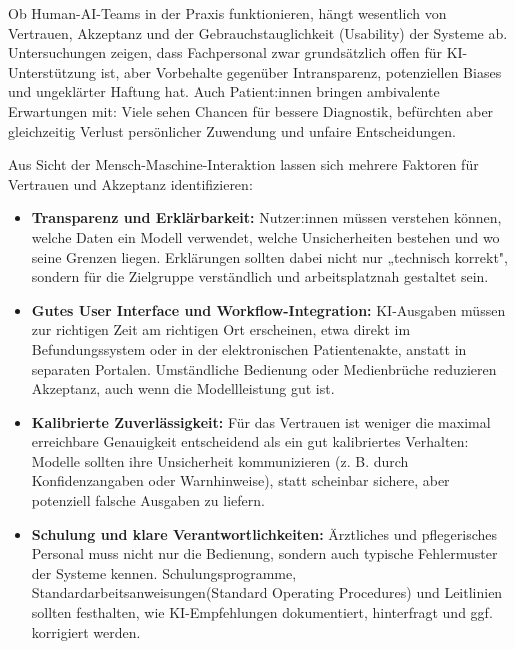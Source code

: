 \documentclass[lettersize,journal]{IEEEtran}
\begin{document}
	
	\label{subsec:vertrauen}
	
	Ob Human-AI-Teams in der Praxis funktionieren, hängt wesentlich von Vertrauen, Akzeptanz und der Gebrauchstauglichkeit (Usability) der Systeme ab. Untersuchungen zeigen, dass Fachpersonal zwar grundsätzlich offen für KI-Unterstützung ist, aber Vorbehalte gegenüber Intransparenz, potenziellen Biases und ungeklärter Haftung hat\cite{ref:hai2025aiindex}\cite{ref:celi2022bias}\cite{ref:faiyazuddin2025}. Auch Patient:innen bringen ambivalente Erwartungen mit: Viele sehen Chancen für bessere Diagnostik, befürchten aber gleichzeitig Verlust persönlicher Zuwendung und unfaire Entscheidungen\cite{ref:hai2025aiindex}.
	
	Aus Sicht der Mensch-Maschine-Interaktion lassen sich mehrere Faktoren für Vertrauen und Akzeptanz identifizieren\cite{ref:chen2022}\cite{ref:Artsi.2025}:
	
	\begin{itemize}
		\item \textbf{Transparenz und Erklärbarkeit:} Nutzer:innen müssen verstehen können, welche Daten ein Modell verwendet, welche Unsicherheiten bestehen und wo seine Grenzen liegen. Erklärungen sollten dabei nicht nur „technisch korrekt", sondern für die Zielgruppe verständlich und arbeitsplatznah gestaltet sein.
		\item \textbf{Gutes User Interface und Workflow-Integration:} KI-Ausgaben müssen zur richtigen Zeit am richtigen Ort erscheinen, etwa direkt im Befundungssystem oder in der elektronischen Patientenakte, anstatt in separaten Portalen. Umständliche Bedienung oder Medienbrüche reduzieren Akzeptanz, auch wenn die Modellleistung gut ist\cite{ref:Artsi.2025}.
		\item \textbf{Kalibrierte Zuverlässigkeit:} Für das Vertrauen ist weniger die maximal erreichbare Genauigkeit entscheidend als ein gut kalibriertes Verhalten: Modelle sollten ihre Unsicherheit kommunizieren (z. B. durch Konfidenzangaben oder Warnhinweise), statt scheinbar sichere, aber potenziell falsche Ausgaben zu liefern.
		\item \textbf{Schulung und klare Verantwortlichkeiten:} Ärztliches und pflegerisches Personal muss nicht nur die Bedienung, sondern auch typische Fehlermuster der Systeme kennen. Schulungsprogramme, Standardarbeitsanweisungen(Standard Operating Procedures) und Leitlinien sollten festhalten, wie KI-Empfehlungen dokumentiert, hinterfragt und ggf. korrigiert werden\cite{ref:faiyazuddin2025}.
	\end{itemize}
	
\end{document}
